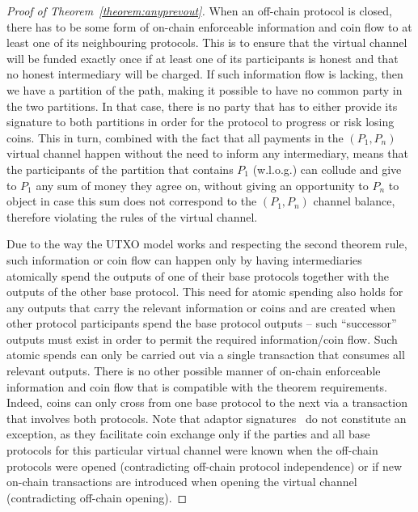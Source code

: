   \begin{proof}[Proof of Theorem~\ref{theorem:anyprevout}]
    When an off-chain protocol is closed, there has to be some form of
    on-chain enforceable information and coin flow to at least one of its neighbouring
    protocols. This is to ensure that the virtual channel will be funded exactly
    once if at least one of its participants is honest and that no honest
    intermediary will be charged. If such information flow is lacking, then we
    have a partition of the path, making it possible to have no common party in
    the two partitions. In that case, there is no party that has to either
    provide its signature to both partitions in order for the protocol to
    progress or risk losing coins. This in turn, combined with the fact that all
    payments in the $(P_1, P_n)$ virtual channel happen without the need to
    inform any intermediary, means that the participants of the partition that
    contains $P_1$ (w.l.o.g.) can collude and give to $P_1$ any sum of money
    they agree on, without giving an opportunity to $P_n$ to object in case this
    sum does not correspond to the $(P_1, P_n)$ channel balance, therefore
    violating the rules of the virtual channel.

    Due to the way the UTXO model works and respecting the second theorem rule,
    such information or coin flow can
    happen only by having intermediaries atomically spend the outputs of one of
    their base protocols together with the outputs of the other base protocol.
    This need for atomic spending also holds for any outputs that carry the
    relevant information or coins and are created when other protocol
    participants spend the base protocol outputs -- such ``successor'' outputs
    must exist in order to permit the required information/coin flow. Such
    atomic spends can only be carried out via a single transaction that consumes
    all relevant outputs. There is no other possible manner of on-chain
    enforceable information and coin flow that is compatible with the theorem
    requirements. Indeed, coins can only cross from one base protocol to the
    next via a transaction that involves both protocols. Note that adaptor
    signatures~\cite{DBLP:journals/iacr/AumayrEEFHMMR20} do not constitute an exception, as
    they facilitate coin exchange only if the parties and all base protocols for
    this particular virtual channel were known when the off-chain protocols were
    opened (contradicting off-chain protocol independence) or if new on-chain
    transactions are introduced when opening the virtual channel (contradicting
    off-chain opening).


\end{proof}

